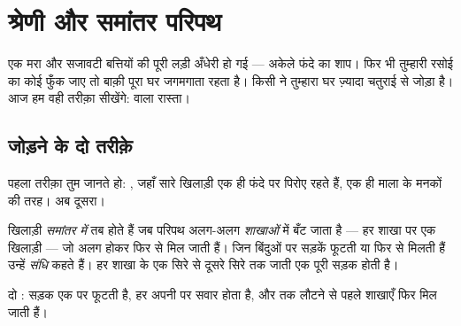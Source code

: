 \chapter{श्रेणी और समांतर परिपथ}\label{ch:g5:series-parallel-circuits}

एक  मरा और सजावटी बत्तियों की पूरी लड़ी अँधेरी हो गई --- अकेले
फंदे का शाप। फिर भी तुम्हारी रसोई का कोई  फुँक जाए तो बाक़ी पूरा
घर जगमगाता रहता है। किसी ने तुम्हारा घर ज़्यादा चतुराई से जोड़ा है।
आज हम वही तरीक़ा सीखेंगे:  वाला रास्ता।

\section{जोड़ने के दो तरीक़े}

पहला तरीक़ा तुम जानते हो: \emph{}, जहाँ सारे खिलाड़ी एक ही
फंदे पर पिरोए रहते हैं, एक ही माला के मनकों की तरह। अब दूसरा।

\begin{definition}[समांतर में]\label{def:g5:series-parallel-circuits:parallel}
खिलाड़ी \emph{समांतर में} तब होते हैं जब परिपथ
अलग-अलग \emph{शाखाओं} में बँट जाता है --- हर शाखा पर एक
खिलाड़ी --- जो अलग होकर फिर से मिल जाती हैं। जिन बिंदुओं पर सड़कें
फूटती या फिर से मिलती हैं उन्हें \emph{संधि} कहते हैं। हर
शाखा  के एक सिरे से दूसरे सिरे तक जाती एक पूरी सड़क होती है।
\end{definition}

\begin{omfigure}

{\small {} दो : सड़क एक  पर फूटती है, हर  अपनी
 पर सवार होता है, और  तक लौटने से पहले शाखाएँ फिर मिल जाती
हैं।}
\end{omfigure}

